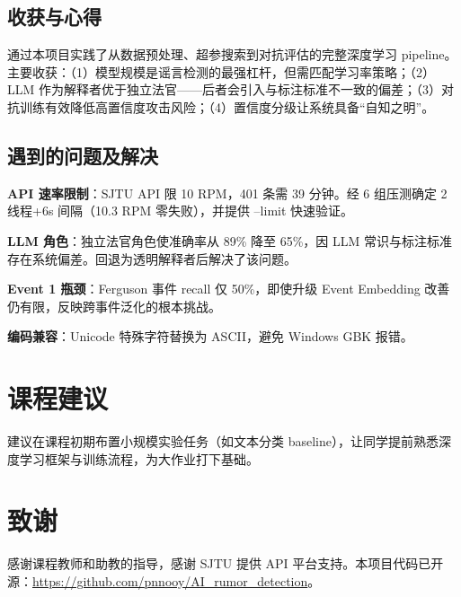 \documentclass[10pt,conference]{IEEEtran}
\begin{document}
\subsection{收获与心得}

通过本项目实践了从数据预处理、超参搜索到对抗评估的完整深度学习 pipeline。主要收获：（1）模型规模是谣言检测的最强杠杆，但需匹配学习率策略；（2）LLM 作为解释者优于独立法官——后者会引入与标注标准不一致的偏差；（3）对抗训练有效降低高置信度攻击风险；（4）置信度分级让系统具备“自知之明”。

\subsection{遇到的问题及解决}

\textbf{API 速率限制}：SJTU API 限 10 RPM，401 条需 39 分钟。经 6 组压测确定 2 线程+6s 间隔（10.3 RPM 零失败），并提供 --limit 快速验证。

\textbf{LLM 角色}：独立法官角色使准确率从 89\% 降至 65\%，因 LLM 常识与标注标准存在系统偏差。回退为透明解释者后解决了该问题。

\textbf{Event 1 瓶颈}：Ferguson 事件 recall 仅 50\%，即使升级 Event Embedding 改善仍有限，反映跨事件泛化的根本挑战。

\textbf{编码兼容}：Unicode 特殊字符替换为 ASCII，避免 Windows GBK 报错。

\section{课程建议}

建议在课程初期布置小规模实验任务（如文本分类 baseline），让同学提前熟悉深度学习框架与训练流程，为大作业打下基础。

\section*{致谢}
感谢课程教师和助教的指导，感谢 SJTU 提供 API 平台支持。本项目代码已开源：\url{https://github.com/pnnooy/AI_rumor_detection}。
\end{document}
